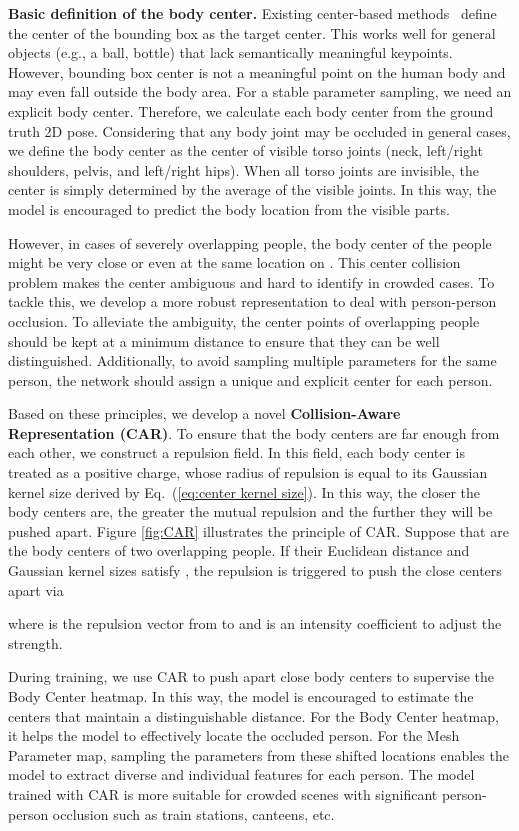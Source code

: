\documentclass[10pt,twocolumn,letterpaper]{article}
\begin{document}
\textbf{Basic definition of the body center.} Existing center-based methods~\cite{duan2019centernet,zhou2019objects} define the center of the bounding box as the target center. 
This works well for general objects (e.g., a ball, bottle) that lack semantically meaningful keypoints.
However, bounding box center is not a meaningful point on the human body and may even fall outside the body area.
For a stable parameter sampling, we need an explicit body center.
Therefore, we calculate each body center from the ground truth 2D pose. 
Considering that any body joint may be occluded in general cases, we define the body center as the center of visible torso joints (neck, left/right shoulders, pelvis, and left/right hips). 
When all torso joints are invisible, the center is simply determined by the average of the visible joints.
In this way, the model is encouraged to predict the body location from the visible parts. 

However, in cases of severely overlapping people, the body center of the people might be very close or even at the same location on .
This center collision problem makes the center ambiguous and hard to identify in crowded cases.
To tackle this, we develop a more robust representation to deal with person-person occlusion.
To alleviate the ambiguity, the center points of overlapping people should be kept at a minimum distance to ensure that they can be well distinguished. 
Additionally, to avoid sampling multiple parameters for the same person, the network should assign a unique and explicit center for each person.

Based on these principles, we develop a novel \textbf{Collision-Aware Representation (CAR)}. 
To ensure that the body centers are far enough from each other, we construct a repulsion field. 
In this field, each body center is treated as a positive charge, whose radius of repulsion is equal to its Gaussian kernel size derived by Eq.~(\ref{eq:center kernel size}).
In this way, the closer the body centers are, the greater the mutual repulsion and the further they will be pushed apart. 
Figure \ref{fig:CAR} illustrates the principle of CAR.  
Suppose that  are the  body centers of two overlapping people. 
If  their Euclidean distance  and Gaussian kernel sizes  satisfy  , the repulsion is triggered to push the close centers apart  via

where  is the repulsion vector from  to  and  is an intensity coefficient to adjust the strength. 

During training, we use CAR to push apart close body centers to supervise the Body Center heatmap. 
In this way, the model is encouraged to estimate the  centers that maintain a distinguishable distance.
For the Body Center heatmap, it helps the model to effectively locate the occluded person.
For the Mesh Parameter map, sampling the parameters from these shifted locations enables the model to extract diverse and individual features for each person.
The model trained with CAR is more suitable for crowded scenes with significant person-person occlusion such as train stations, canteens, etc.
\end{document}
